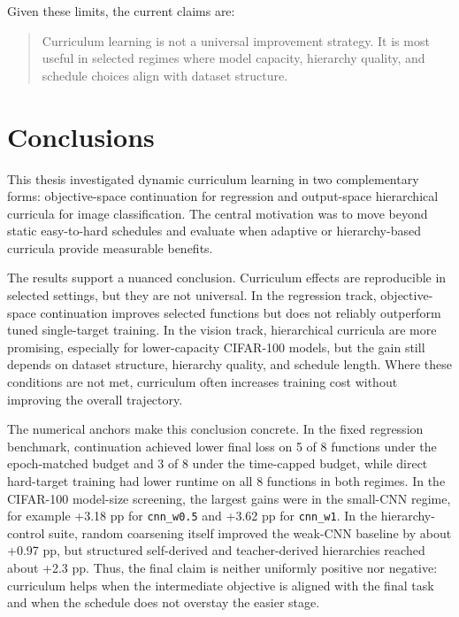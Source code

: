 \documentclass[english,master,a4paper,oneside]{ppfcmthesis}
\begin{document}
Given these limits, the current claims are:

\begin{quote}
Curriculum learning is not a universal improvement strategy. It is most useful
in selected regimes where model capacity, hierarchy quality, and schedule
choices align with dataset structure.
\end{quote}

\chapter{Conclusions}
\label{chap:conclusions}

This thesis investigated dynamic curriculum learning in two complementary forms:
objective-space continuation for regression and output-space hierarchical
curricula for image classification. The central motivation was to move beyond
static easy-to-hard schedules and evaluate when adaptive or hierarchy-based
curricula provide measurable benefits.

The results support a nuanced conclusion. Curriculum effects are reproducible in
selected settings, but they are not universal. In the regression track,
objective-space continuation improves selected functions but does not reliably
outperform tuned single-target training. In the vision track, hierarchical curricula
are more promising, especially for lower-capacity CIFAR-100 models, but the gain
still depends on dataset structure, hierarchy quality, and schedule length.
Where these conditions are not met, curriculum often increases training cost
without improving the overall trajectory.

The numerical anchors make this conclusion concrete. In the fixed regression
benchmark, continuation achieved lower final loss on 5 of 8 functions under the
epoch-matched budget and 3 of 8 under the time-capped budget, while direct
hard-target training had lower runtime on all 8 functions in both regimes. In the CIFAR-100 model-size
screening, the largest gains were in the small-CNN regime, for example +3.18 pp
for \texttt{cnn\_w0.5} and +3.62 pp for \texttt{cnn\_w1}. In the hierarchy-control
suite, random coarsening itself improved the weak-CNN baseline by about +0.97 pp,
but structured self-derived and teacher-derived hierarchies reached about +2.3 pp.
Thus, the final claim is neither uniformly positive nor negative: curriculum
helps when the intermediate objective is aligned with the final task and when the
schedule does not overstay the easier stage.
\end{document}
